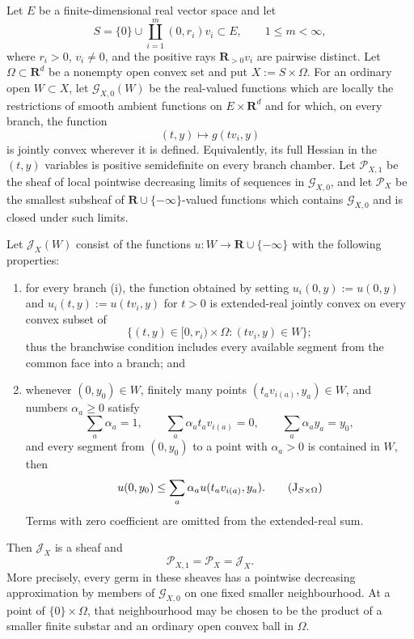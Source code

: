 \begin{theorem}
\label{thm:p071-finite-star-euclidean-collapse}
Let \(E\) be a finite-dimensional real vector space and let
\[
 S=\{0\}\cup\coprod_{i=1}^{m}(0,r_i)v_i\subset E,
 \qquad 1\leq m<\infty,
\]
where \(r_i>0\), \(v_i\ne0\), and the positive rays
\(\mathbf R_{>0}v_i\) are pairwise distinct.  Let
\(\Omega\subset\mathbf R^d\) be a nonempty open convex set and put
\(X:=S\times\Omega\).  For an ordinary open \(W\subset X\), let
\(\mathcal G_{X,0}(W)\) be the real-valued functions which are locally the
restrictions of smooth ambient functions on \(E\times\mathbf R^d\) and for
which, on every branch, the function
\[
 (t,y)\longmapsto g(tv_i,y)
\]
is jointly convex wherever it is defined.  Equivalently, its full Hessian in
the \((t,y)\) variables is positive semidefinite on every branch chamber.
Let \(\mathcal P_{X,1}\) be the sheaf of local pointwise decreasing limits
of sequences in \(\mathcal G_{X,0}\), and let \(\mathcal P_X\) be the
smallest subsheaf of \(\mathbf R\cup\{-\infty\}\)-valued functions which
contains \(\mathcal G_{X,0}\) and is closed under such limits.

Let \(\mathcal J_X(W)\) consist of the functions
\(u:W\to\mathbf R\cup\{-\infty\}\) with the following properties:
\begin{enumerate}
\item for every branch (i), the function obtained by setting
      \(u_i(0,y):=u(0,y)\) and \(u_i(t,y):=u(tv_i,y)\) for \(t>0\)
      is extended-real jointly convex on every convex subset of
      \[
       \{(t,y)\in[0,r_i)\times\Omega:(tv_i,y)\in W\};
      \]
      thus the branchwise condition includes every available segment from
      the common face into a branch; and
\item whenever \((0,y_0)\in W\), finitely many points
      \((t_a v_{i(a)},y_a)\in W\), and numbers \(\alpha_a\geq0\) satisfy
      \[
       \sum_a\alpha_a=1,
       \qquad
       \sum_a\alpha_a t_av_{i(a)}=0,
       \qquad
       \sum_a\alpha_a y_a=y_0,
      \]
      and every segment from \((0,y_0)\) to a point with
      \(\alpha_a>0\) is contained in \(W\), then
      \[
       u(0,y_0)\leq
       \sum_a\alpha_a u(t_av_{i(a)},y_a).
       \tag{\(\mathrm J_{S\times\Omega}\)}
      \]
      Terms with zero coefficient are omitted from the extended-real sum.
\end{enumerate}
Then \(\mathcal J_X\) is a sheaf and
\[
              \mathcal P_{X,1}=\mathcal P_X=\mathcal J_X.
\]
More precisely, every germ in these sheaves has a pointwise decreasing
approximation by members of \(\mathcal G_{X,0}\) on one fixed smaller
neighbourhood.  At a point of \(\{0\}\times\Omega\), that neighbourhood
may be chosen to be the product of a smaller finite substar and an ordinary
open convex ball in \(\Omega\).
\end{theorem}

